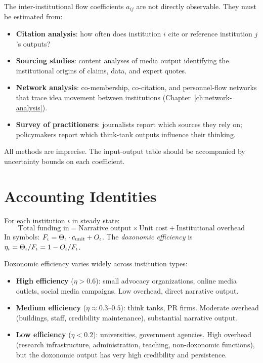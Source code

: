 \begin{remark}
\label{rem:estimating-A}
The inter-institutional flow coefficients $a_{ij}$ are not directly observable.
They must be estimated from:
\begin{itemize}[nosep]
  \item \textbf{Citation analysis}: how often does institution $i$ cite or reference institution $j$'s outputs?
  \item \textbf{Sourcing studies}: content analyses of media output identifying the institutional origins of claims, data, and expert quotes.
  \item \textbf{Network analysis}: co-membership, co-citation, and personnel-flow networks that trace idea movement between institutions (Chapter~\ref{ch:network-analysis}).
  \item \textbf{Survey of practitioners}: journalists report which sources they rely on; policymakers report which think-tank outputs influence their thinking.
\end{itemize}
All methods are imprecise.
The input-output table should be accompanied by uncertainty bounds on each coefficient.
\end{remark}


\section{Accounting Identities}
\label{sec:ch14-identities}

\begin{principle}
\label{prin:accounting-identity}
For each institution $\iota$ in steady state:
\[
  \text{Total funding in} = \text{Narrative output} \times \text{Unit cost} + \text{Institutional overhead}
\]
In symbols: $F_{\iota} = \Theta_{\iota} \cdot c_{\text{unit}} + O_{\iota}$.
The \emph{doxonomic efficiency} is $\eta_{\iota} = \Theta_{\iota} / F_{\iota} = 1 - O_{\iota}/F_{\iota}$.
\end{principle}

Doxonomic efficiency varies widely across institution types:
\begin{itemize}[nosep]
  \item \textbf{High efficiency} ($\eta > 0.6$): small advocacy organizations, online media outlets, social media campaigns.
  Low overhead, direct narrative output.
  \item \textbf{Medium efficiency} ($\eta \approx 0.3$--$0.5$): think tanks, PR firms.
  Moderate overhead (buildings, staff, credibility maintenance), substantial narrative output.
  \item \textbf{Low efficiency} ($\eta < 0.2$): universities, government agencies.
  High overhead (research infrastructure, administration, teaching, non-doxonomic functions), but the doxonomic output has very high credibility and persistence.
\end{itemize}

